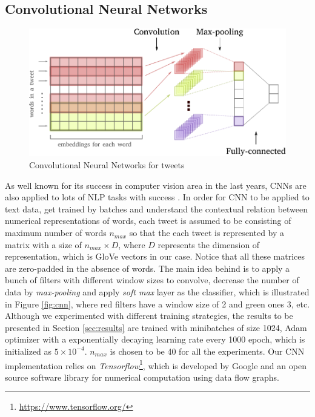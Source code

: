 \subsection{Convolutional Neural Networks}
\begin{figure}[h!]
	\centering
	\includegraphics[width=0.8\columnwidth]{CNN_text.pdf}
	\caption{Convolutional Neural Networks for tweets}
	\label{fig:awesome_image}
\end{figure}

As well known for its success in computer vision area in the last years, CNNs are also applied to lots of NLP tasks with success \cite{kim14conv}. 
In order for CNN to be applied to text data, get trained by batches and understand the contextual relation between numerical representations of words, each tweet is assumed to be consisting of maximum number of words $n_{max}$ so that the each tweet is represented by a matrix with a size of $n_{max} \times D$, where $D$ represents the dimension of representation, which is GloVe vectors in our case.
Notice that all these matrices are zero-padded in the absence of words.
The main idea behind is to apply a bunch of filters with different window sizes to convolve, decrease the number of data by \textit{max-pooling} and apply \textit{soft max} layer as the classifier, which is illustrated in Figure \ref{fig:cnn}, where red filters have a window size of 2 and green ones 3, etc.
Although we experimented with different training strategies, the results to be presented in Section \ref{sec:results} are trained with minibatches of size 1024, Adam optimizer with a exponentially decaying learning rate every 1000 epoch, which is initialized as $5 \times 10^{-4}$. 
$n_{max}$ is chosen to be 40 for all the experiments.
Our CNN implementation relies on \textit{Tensorflow}\footnote{\url{https://www.tensorflow.org/}}, which is developed by Google and an open source software library for numerical computation using data flow graphs.